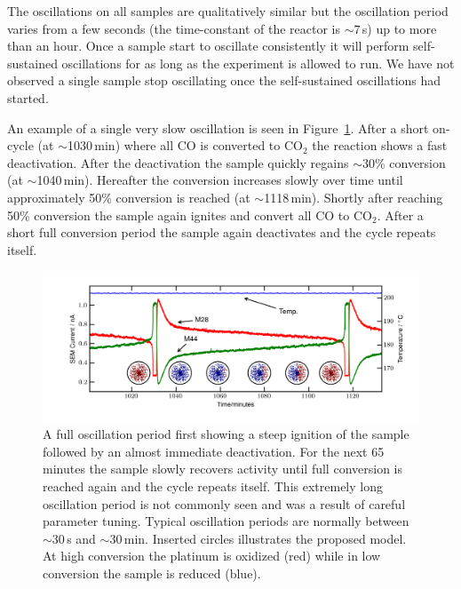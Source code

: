 \documentclass[8.5pt,twoside,twocolumn]{article}
\begin{document}
The oscillations on all samples are qualitatively similar but the oscillation period varies from a few seconds (the time-constant of the reactor is $\sim7\,$s) up to more than an hour. Once a sample start to oscillate consistently it will perform self-sustained oscillations for as long as the experiment is allowed to run. We have not observed a single sample stop oscillating once the self-sustained oscillations had started. 

An example of a single very slow oscillation is seen in Figure~\ref{fgr:full_oscillation}. After a short on-cycle (at $\sim$1030\,min) where all CO is converted to CO$_2$ the reaction shows a fast deactivation. After the deactivation the sample quickly regains $\sim$30\% conversion (at $\sim$1040\,min). Hereafter the conversion increases slowly over time until approximately 50\% conversion is reached (at $\sim$1118\,min). Shortly after reaching 50\% conversion the sample again ignites and convert all CO to CO$_2$. After a short full conversion period the sample again deactivates and the cycle repeats itself.
\begin{figure}
  \centering
  \includegraphics[width=17cm]{single_full_oscillation.png}
  \caption{A full oscillation period first showing a steep ignition of the sample followed by an almost immediate deactivation. For the next 65 minutes the sample slowly recovers activity until full conversion is reached again and the cycle repeats itself. This extremely long oscillation period is not commonly seen and was a result of careful parameter tuning. Typical oscillation periods are normally between $\sim$30\,s and $\sim$30\,min. Inserted circles illustrates the proposed model. At high conversion the platinum is oxidized (red) while in low conversion the sample is reduced (blue).}
  \label{fgr:full_oscillation}
\end{figure}
\end{document}
